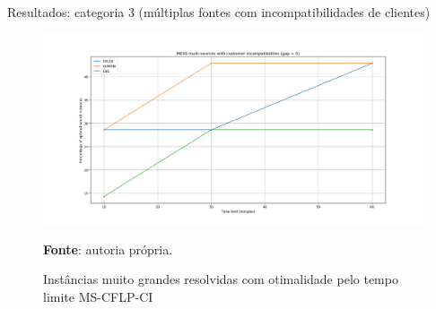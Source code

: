 \documentclass[aspectratio=169]{beamer}
\begin{document}
	\begin{frame}{Resultados: categoria 3 (múltiplas fontes com incompatibilidades de clientes)} %
		
		\begin{figure}[H]
			\begin{center}
				\caption{Instâncias muito grandes resolvidas com otimalidade pelo tempo limite MS-CFLP-CI \cite{Maia}}
				
				\includegraphics[height=0.6\textheight]{res/MESS MS CI - Optimal x Time.png}
				\label{Opt:T:MS:CI:Maia}
				
				\textbf{Fonte}: autoria própria.
			\end{center}
		\end{figure}
		
	\end{frame}
\end{document}
